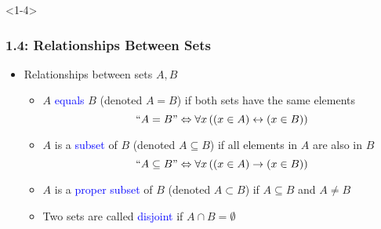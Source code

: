 \documentclass[10pt,english,aspectratio=169]{beamer}
\begin{document}
\begin{frame}<1-4> \frametitle{1.4: Relationships Between Sets}

\begin{itemize}
\setlength\itemsep{3mm}
\item<1-> Relationships between sets $A,B$ \vspace{1mm}
\begin{itemize} 
  \setlength\itemsep{1.5mm}
  \item<1-> $A$ \textcolor{blue}{equals} $B$ (denoted $A=B$) if both sets have the same elements
\[ ``A=B" \Leftrightarrow \forall x \left( (x\in A)\leftrightarrow (x\in B) \right) \]
  \item<2-> $A$ is a \textcolor{blue}{subset} of $B$ (denoted $A\subseteq B$) if all elements in $A$ are also in $B$
\[ ``A\subseteq B"  \Leftrightarrow \forall x \left( (x\in A)\rightarrow (x\in B) \right) \]
  \item<3-> $A$ is a \textcolor{blue}{proper subset} of $B$ (denoted $A\subset B$) if $A\subseteq B$ and $A\neq B$ \vspace{2mm}
  \item<4-> Two sets are called \textcolor{blue}{disjoint} if $A\cap B = \emptyset$
\end{itemize}

\end{itemize}


\end{frame}
\end{document}
